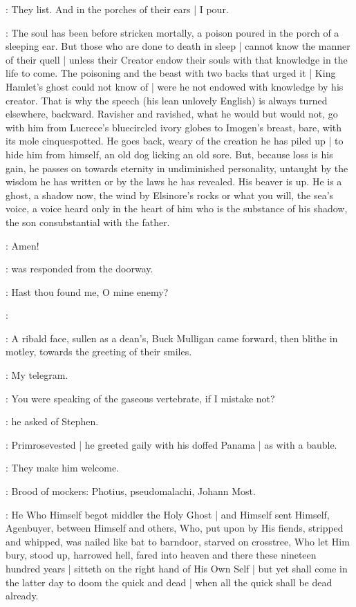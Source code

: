 \StephenInt:
They list.
And in the porches of their ears |
I pour.

\Stephen:
The soul has been before stricken mortally,
a poison poured in the porch of a sleeping ear.
But those who are done to death in sleep |
cannot know the manner of their quell |
unless their Creator endow their souls
with that knowledge in the life to come.
The poisoning and the beast with two backs that urged it |
King Hamlet's ghost could not know of |
were he not endowed with knowledge by his creator.
That is why the speech
(his lean unlovely English)
is always turned elsewhere, backward.
Ravisher and ravished,
what he would but would not,
go with him from Lucrece's bluecircled ivory globes to Imogen's breast,
bare, with its mole cinquespotted.
He goes back,
weary of the creation he has piled up |
to hide him from himself,
an old dog licking an old sore.
But, because loss is his gain,
he passes on towards eternity in undiminished personality,
untaught by the wisdom he has written
or by the laws he has revealed.
His beaver is up.
He is a ghost, a shadow now,
the wind by Elsinore's rocks or what you will,
the sea's voice,
a voice heard only in the heart of him
who is the substance of his shadow,
the son consubstantial with the father.

\mulligan:
Amen!

:
was responded from the doorway.

\StephenInt:
Hast thou found me,
O mine enemy?




\StephenInt:

:
A ribald face,
sullen as a dean's,
Buck Mulligan came forward,
then blithe in motley,
towards the greeting of their smiles.

\StephenInt:
My telegram.

\mulligan:
You were speaking of the gaseous vertebrate,
if I mistake not?

:
he asked of Stephen.

:
Primrosevested |
he greeted gaily with his doffed Panama |
as with a bauble.%

\StephenInt:
They make him welcome.

\StephenInt:
Brood of mockers:
Photius,
pseudomalachi,
Johann Most.

\StephenInt:
He Who Himself begot middler the Holy Ghost |
and Himself sent Himself,
Agenbuyer,
between Himself and others,
Who,
put upon by His fiends,
stripped and whipped,
was nailed like bat to barndoor,
starved on crosstree,
Who let Him bury,
stood up,
harrowed hell,
fared into heaven and there these nineteen hundred years |
sitteth on the right hand of His Own Self |
but yet shall come in the latter day to doom the quick and dead |
when all the quick shall be dead already.

